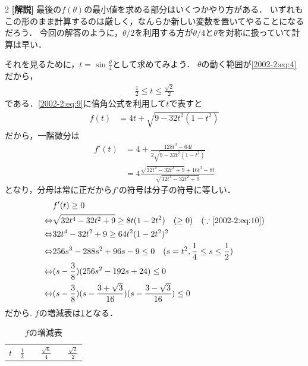 \documentclass[../../main.tex]{subfiles}
\begin{document}
\begin{multicols}{2}
  \vspace{10pt}
  {\bf[解説]}
  最後の$f(\theta)$の最小値を求める部分はいくつかやり方がある．
  いずれもこの形のまま計算するのは厳しく，なんらか新しい変数を置いてやることになるだろう．
  今回の解答のように，$\theta/2$を利用する方が$\theta/4$と$\theta$を対称に扱っていて計算は早い．

  それを見るために，$t=\sin\frac{\theta}{4}$として求めてみよう．
  $\theta$の動く範囲が\cref{2002-2:eq:4}だから，
  \begin{align}
    \frac{1}{2} \le t \le \frac{\sqrt{2}}{2} \label{2002-2:eq:10}
  \end{align}
  である．\cref{2002-2:eq:9}に倍角公式を利用して$t$で表すと
  \begin{align*}
    f(t) & = 4t + \sqrt{9-32t^2(1-t^2)}
  \end{align*}
  だから，一階微分は
  \begin{align*}
    f'(t)
     & = 4 + \frac{128t^3 - 64t}{2\sqrt{9-32t^2(1-t^2)}}              \\
     & = 4 \frac{\sqrt{32t^4-32t^2+9}+16t^3-8t}{\sqrt{32t^4-32t^2+9}}
  \end{align*}
  となり，分母は常に正だから$f'$の符号は分子の符号に等しい．
  \begin{align*}
                    & f'(t) \ge 0                                                                                   \\
    \Leftrightarrow & \sqrt{32t^4-32t^2+9} \ge 8t(1-2t^2) \quad (\ge 0) \quad (\because \text{\cref{2002-2:eq:10}}) \\
    \Leftrightarrow & 32t^4-32t^2+9 \ge 64t^2(1-2t^2)^2                                                             \\
    \Leftrightarrow & 256s^3-288s^2+96s-9 \le 0 \quad (s=t^2, \frac{1}{4} \le s \le \frac{1}{2})                    \\
    \Leftrightarrow & (s-\frac{3}{8})(256s^2-192s+24) \le 0                                                         \\
    \Leftrightarrow & (s-\frac{3}{8})(s-\frac{3+\sqrt{3}}{16})(s-\frac{3-\sqrt{3}}{16}) \le 0
  \end{align*}
  だから. $f$の増減表は\cref{2002-2:table:2}となる．
  \begin{table}[H]
    \centering
    \caption{$f$の増減表}
    \label{2002-2:table:2}
    \begin{tabular}{|c||c|c|c|c|c|}
      \hline
      $t$     & $\frac{1}{2}$ &            & $\frac{\sqrt{6}}{4}$ &            & $\frac{\sqrt{2}}{2}$ \\

\end{tabular}
\end{table}
\end{multicols}
\end{document}
